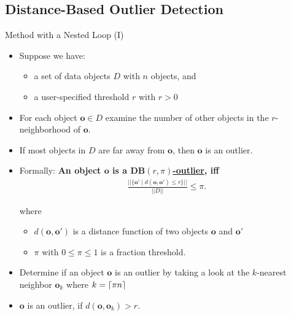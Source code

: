 \subsection{Distance-Based Outlier Detection}
\begin{frame}{Method with a Nested Loop (I)}
	\begin{itemize}
		\item Suppose we have:
		      \begin{itemize}
			      \item a set of data objects $D$ with $n$ objects, and
			      \item a user-specified threshold $r$ with $r > 0$
		      \end{itemize}
		\item For each object $\mathbf{o}\in D$ examine the number of other objects in the $r$-neighborhood of $\mathbf{o}$.
		\item If most objects in $D$ are far away from $\mathbf{o}$, then $\mathbf{o}$ is an outlier.
		\item Formally: \textbf{An object $\mathbf{o}$ is a \underline{$\mathbf{DB}(r, \pi)$-outlier}, iff}
		      \begin{align*}\label{db-outlier}
			      \frac{||\{\mathbf{o'} \; \vert \; d(\mathbf{o},\mathbf{o'}) \leq r \}|| }{||D||} \leq \pi.
		      \end{align*}

		      where
		      \begin{itemize}
			      \item $d(\mathbf{o},\mathbf{o}')$ is a distance function of two objects $\mathbf{o}$ and $\mathbf{o}'$
			      \item $\pi$ with $0\leq\pi\leq1$ is a fraction threshold.
		      \end{itemize}
		\item Determine if an object $\mathbf{o}$ is an outlier by taking a look at the $k$-nearest neighbor $\mathbf{o}_k$ where $k=\ceil*{\pi n}$
		\item $\mathbf{o}$ is an outlier, if $d(\mathbf{o}, \mathbf{o}_k) > r$.
	\end{itemize}
\end{frame}

